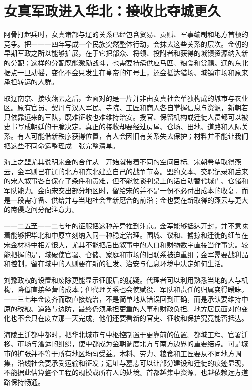\section{女真军政进入华北：接收比夺城更久}

阿骨打起兵时，女真诸部与辽的关系已经包含贸易、贡赋、军事编制和地方首领的竞争。把一一一四年写成一个民族突然整体行动，会抹去这些关系的层次。金朝的早期军政之所以能够扩展，在于它把部众、将领、投附者和获得的城镇资源纳入新的分配；这样的分配既能激励战斗，也需要持续供应马匹、粮食和赏赐。辽的东北据点一旦动摇，变化不会只发生在皇帝的年号上，还会抵达猎场、城镇市场和原来承担转运的人群。

取辽南京、接收燕云之后，金面对的是一片并非由女真社会单独构成的城市与农业区。原有官员、契丹与汉人军民、寺院、工匠和商人各自掌握信息与资源，新朝若只依靠远来的军队，既难征收也难维持治安。授官、保留机构或迁徙人员都可以被史书写成朝廷的干脆决定，真正的接收却要经过房屋、仓场、田地、道路和人际关系。有人可能借新秩序获得位置，有人会因旧有关系失去保护；材料并不能让我们把这些不同命运整理成一张完整清单。

海上之盟尤其说明宋金的合作从一开始就带着不同的空间目标。宋朝希望取得燕云，金军则已在辽的北方和东北建立自己的战争节奏。盟约文本、交聘记录和后来的宋人叙事各自保存了条件和责难，但不能使谈判桌上的话自动替代城门、仓储和军队能力。金向宋交出部分地区时，留给宋的并不是一份不必付出成本的收复，而是一段需守备、供给并与当地社会重新磨合的前沿；金也要在新取得的燕云与更大的南侵之间分配注意力。

一一二五至一一二七年的征服把这种差异推到汴京。金军能够抵达开封，并不意味着能够把华北和中原立刻纳入同一种稳定治理。围城、议和、掳掠和迁徙的细节在宋金材料中相差很大，尤其不能把后出叙事中的人口和财物数字直接当作事实。较能把握的是，城破使官署、仓储、家庭和市场的旧联系被迫重组；金军需要战利品和控制，留在城中的人则要在新的征发、治安与信息环境中决定如何生活。

刘豫政权的设置和废除更能显示征服后的犹疑。代理者可以利用熟悉当地的人与机构，降低直接经营的成本；但代理关系也会使赋役、军队和责任的归属变得暧昧。一一三七年金废齐而改直接统治，不是简单地从错误回到正确，而是承认要维持中原的税粮、道路与边防，最终仍须承担更重的人事和财政负担。地方居民面对的变化也不会只在废立那一天完成，他们还要看新的官吏、征收和保护究竟能否抵达。

海陵王迁都中都时，把华北城市与中枢控制置于更靠前的位置。都城工程、官署迁移、市场与漕运的组织，使中都成为金朝调度北方与南方边界的重要结点。可是城市的扩张并不等于所有地区均匀受益。木料、劳力、粮食和工匠要从不同地方调集，沿线社会要承受运输和征发；遗址与墓志可以让部分建设和迁徙的痕迹显现，不能据此估算整个工程的规模或所有人的处境。首都越集中资源，也越依赖远方道路保持畅通。


